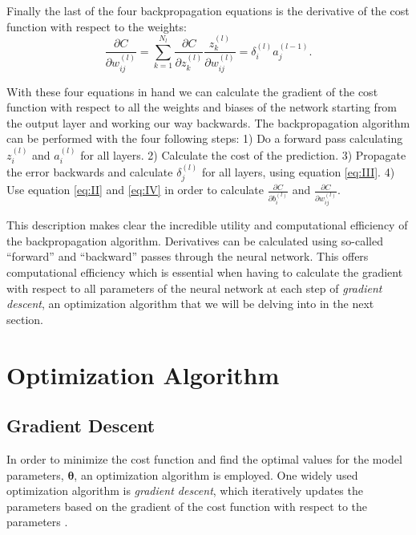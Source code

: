 \documentclass[a4paper, UKenglish, 11pt]{uiomaster}
\begin{document}
Finally the last of the four backpropagation equations is the derivative of the cost function with respect to the weights:
\begin{equation}
  \frac{\partial C}{\partial w_{ij}^{(l)}}
    = \sum_{k = 1}^{N_l} \frac{\partial C}{\partial z_k^{(l)}} \frac{z_k^{(l)}}{\partial w_{ij}^{(l)}}
    = \delta_i^{(l)} a_j^{(l-1)}.
\label{eq:IV}
\end{equation}

With these four equations in hand we can calculate the gradient of the cost function with respect to all the weights and biases of the network starting from the output layer and working our way backwards. The backpropagation algorithm can be performed with the four following steps:
1) Do a forward pass calculating \(z_i^{(l)}\) and \(a_i^{(l)}\) for all layers.
2) Calculate the cost of the prediction.
3) Propagate the error backwards and calculate $\delta_j^{(l)}$ for all layers, using equation \ref{eq:III}.
4) Use equation \ref{eq:II} and \ref{eq:IV} in order to calculate
$\frac{\partial C}{\partial b^{(l)}_{i}}$
and
$\frac{\partial C}{\partial w^{(l)}_{ij}}$.

This description makes clear the incredible utility and computational efficiency of the backpropagation algorithm. Derivatives can be calculated using so-called “forward” and “backward” passes through the neural network. This offers computational efficiency which is essential when having to calculate the gradient with respect to all parameters of the neural network at each step of \emph{gradient descent}, an optimization algorithm that we will be delving into in the next section.






\section{Optimization Algorithm}

\subsection{Gradient Descent}

In order to minimize the cost function and find the optimal values for the model parameters, $\boldsymbol{\theta}$, an optimization algorithm is employed. One widely used optimization algorithm is \emph{gradient descent}, which iteratively updates the parameters based on the gradient of the cost function with respect to the parameters \cite{mehta2019high}.
\end{document}
